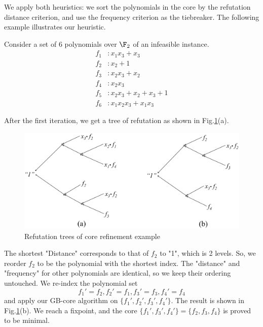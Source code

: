 We apply both heuristics: we sort the polynomials in the core
by the refutation distance criterion, and use the frequency criterion as
the tiebreaker. The following example illustrates our heuristic. 


\begin{example} 
Consider a set of 6 polynomials over $\F_2$ of an
infeasible instance.
\begin{align*}
f_1 &: x_1x_3+x_3\\
f_2 &: x_2 + 1\\
f_3 &: x_2x_3+x_2\\
f_4 &: x_2x_3\\
f_5 &: x_2x_3 + x_2 + x_3 + 1\\
f_6 &: x_1x_2x_3 +x_1x_3
\end{align*}

After the first iteration, we get a tree of refutation as shown in Fig.\ref{fig:refine}(a). 
\begin{figure}[hbt]
\centering
\includegraphics[scale=0.25]{SAT2016_xiaojun/core_refine.eps}
\caption{Refutation trees of core refinement example}
\label{fig:refine}
\end{figure}

The shortest "Distance" corresponds to that of $f_2$ to "1", which is
2 levels. So, we reorder $f_2$ to be the polynomial with the shortest
index. The "distance" and "frequency" for other polynomials are
identical, so we keep their ordering untouched. We re-index the
polynomial set 
$$f_1'=f_2, f_2' = f_1, f_3' = f_3, f_4' = f_4$$
and apply our GB-core algorithm on $\{f_1',f_2',f_3',f_4'\}$. The
result is shown in Fig.\ref{fig:refine}(b). We reach a fixpoint, and
the core $\{f_1', f_3', f_4'\} = \{f_2,f_3,f_4\}$ is proved to be
minimal. 
\end{example}
